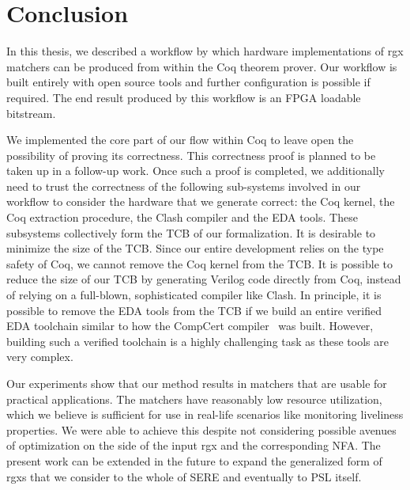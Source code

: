 \chapter{Conclusion}\label{ch:bye}
In this thesis, we described a workflow by which hardware
implementations of \gls{rgx} matchers can be produced from within the
Coq theorem prover.
%
%
%
Our workflow is built entirely with open source tools and further
configuration is possible if required.
The end result produced by this workflow is an \gls{FPGA} loadable
bitstream.


We implemented the core part of our flow within Coq to leave open the
possibility of proving its correctness.
This correctness proof is planned to be taken up in a follow-up work.
%
Once such a proof is completed, we additionally need to trust the
correctness of the following sub-systems involved in our workflow to
consider the hardware that we generate correct:
the Coq kernel, the Coq extraction procedure, the Clash compiler and
the \gls{EDA} tools.
These subsystems collectively form the \gls{TCB} of our formalization.
It is desirable to minimize the size of the \gls{TCB}.
%
Since our entire development relies on the type safety of Coq, we
cannot remove the Coq kernel from the \gls{TCB}.
It is possible to reduce the size of our \gls{TCB} by generating
Verilog code directly from Coq, instead of relying on a full-blown,
sophisticated compiler like Clash.
%
In principle, it is possible to remove the \gls{EDA} tools from the
\gls{TCB} if we build an entire verified \gls{EDA} toolchain similar
to how the CompCert compiler~\cite{leroy2009formal} was built.
However, building such a verified toolchain is a highly challenging
task as these tools are very complex.


Our experiments show that our method results in matchers that are
usable for practical applications.
The matchers have reasonably low resource utilization, which we
believe is sufficient for use in real-life scenarios like monitoring
liveliness properties.
%
We were able to achieve this despite not considering possible avenues
of optimization on the side of the input \gls{rgx} and the
corresponding \gls{NFA}.
The present work can be extended in the future to expand the
generalized form of \glspl{rgx} that we consider to the whole of
\gls{SERE} and eventually to \gls{PSL} itself.

